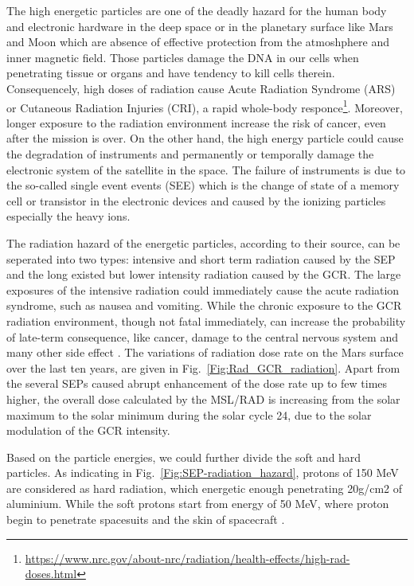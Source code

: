 The high energetic particles are one of the deadly hazard for the human body and electronic hardware in the deep space or in the planetary surface like Mars and Moon which are absence of effective protection from the atmoshphere and inner magnetic field.
Those particles damage the \ac{DNA} in our cells when penetrating tissue or organs and have tendency to kill cells therein. Consequencely, high doses of radiation cause Acute Radiation Syndrome (ARS) or Cutaneous Radiation Injuries (CRI), a rapid whole-body responce\footnote{\url{https://www.nrc.gov/about-nrc/radiation/health-effects/high-rad-doses.html}}. Moreover, longer exposure to the radiation environment increase the risk of cancer, even after the mission is over.
On the other hand, the high energy particle could cause the degradation of instruments and permanently or temporally damage the electronic system of the satellite in the space. The failure of instruments is due to the so-called single event events (SEE) which is the change of state of a memory cell or transistor in the electronic devices and caused by the ionizing particles especially the heavy ions.



The radiation hazard of the energetic particles, according to their source, can be seperated into two types: intensive and short term radiation caused by the \ac{SEP} and the long existed but lower intensity radiation caused by the \ac{GCR}.
The large exposures of the intensive radiation could immediately cause the acute radiation syndrome, such as nausea and vomiting. While the chronic exposure to the GCR radiation environment, though not fatal immediately, can increase the probability of late-term consequence, like cancer, damage to the central nervous system and many other side effect \citep{Guo2021AARv_rad, cucinotta2006cancer, Kennedy2014LSSR, Iancu2018Frontiers}. 
The variations of radiation dose rate on the Mars surface over the last ten years, are given in Fig.~\ref{Fig:Rad_GCR_radiation}. Apart from the several \acp{SEP} caused abrupt enhancement of the dose rate up to few times higher, the overall dose calculated by the MSL/RAD is increasing from the solar maximum to the solar minimum during the solar cycle 24, due to the solar modulation of the GCR intensity.

Based on the particle energies, we could further divide the soft and hard particles.
As indicating in Fig.~\ref{Fig:SEP-radiation_hazard}, protons of 150 MeV are considered as hard radiation, which energetic enough penetrating 20g/cm2 of aluminium. While the soft protons start from energy of 50 MeV, where proton begin to penetrate spacesuits and the skin of spacecraft \citep{Reames2021LNP}. 


